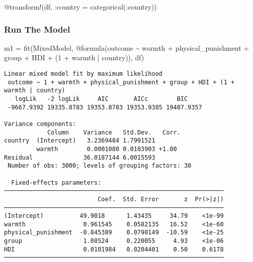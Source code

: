 \documentclass[
  letterpaper,
  DIV=11,
  numbers=noendperiod]{scrreprt}
\newenvironment{Shaded}{\begin{snugshade}}{\end{snugshade}}
\newcommand{\FloatTok}[1]{\textcolor[rgb]{0.68,0.00,0.00}{#1}}
\newcommand{\FunctionTok}[1]{\textcolor[rgb]{0.28,0.35,0.67}{#1}}
\newcommand{\NormalTok}[1]{\textcolor[rgb]{0.00,0.23,0.31}{#1}}
\newcommand{\OperatorTok}[1]{\textcolor[rgb]{0.37,0.37,0.37}{#1}}
\newcommand{\PreprocessorTok}[1]{\textcolor[rgb]{0.68,0.00,0.00}{#1}}
\begin{document}
\begin{Shaded}
\begin{Highlighting}[]
\PreprocessorTok{@transform}\NormalTok{!(df, }\OperatorTok{:}\NormalTok{country }\OperatorTok{=} \FunctionTok{categorical}\NormalTok{(}\OperatorTok{:}\NormalTok{country))}
\end{Highlighting}
\end{Shaded}

\subsubsection{Run The Model}\label{run-the-model-2}

\begin{Shaded}
\begin{Highlighting}[]

\NormalTok{m1 }\OperatorTok{=} \FunctionTok{fit}\NormalTok{(MixedModel, }\PreprocessorTok{@formula}\NormalTok{(outcome }\OperatorTok{\textasciitilde{}}\NormalTok{ warmth }\OperatorTok{+}\NormalTok{ physical\_punishment }\OperatorTok{+} 
\NormalTok{               group }\OperatorTok{+}\NormalTok{ HDI }\OperatorTok{+}
\NormalTok{               (}\FloatTok{1} \OperatorTok{+}\NormalTok{ warmth }\OperatorTok{|}\NormalTok{ country)), df)}
\end{Highlighting}
\end{Shaded}

\begin{verbatim}
Linear mixed model fit by maximum likelihood
 outcome ~ 1 + warmth + physical_punishment + group + HDI + (1 + warmth | country)
   logLik   -2 logLik     AIC       AICc        BIC    
 -9667.9392 19335.8783 19353.8783 19353.9385 19407.9357

Variance components:
            Column    Variance   Std.Dev.   Corr.
country  (Intercept)   3.2369484 1.7991521
         warmth        0.0001080 0.0103903 +1.00
Residual              36.0187144 6.0015593
 Number of obs: 3000; levels of grouping factors: 30

  Fixed-effects parameters:
─────────────────────────────────────────────────────────────
                          Coef.  Std. Error       z  Pr(>|z|)
─────────────────────────────────────────────────────────────
(Intercept)          49.9018      1.43435     34.79    <1e-99
warmth                0.961545    0.0582135   16.52    <1e-60
physical_punishment  -0.845389    0.0798149  -10.59    <1e-25
group                 1.08524     0.220055     4.93    <1e-06
HDI                   0.0101984   0.0204401    0.50    0.6178
─────────────────────────────────────────────────────────────
\end{verbatim}
\end{document}
